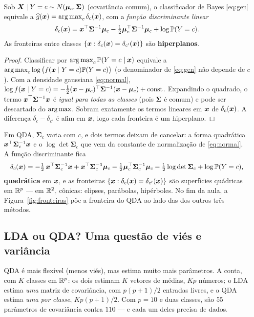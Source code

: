 \documentclass[11pt,a4paper]{article}
\begin{document}
\begin{proposicao}\label{prop:lda}
Sob $\bm{X}\mid Y=c\sim N(\bm{\mu}_c,\bm{\Sigma})$ (covariância comum), o classificador
de Bayes \eqref{eq:gen} equivale a $\ghat(\x)=\argmax_c \delta_c(\x)$, com a
\emph{função discriminante linear}
\[
  \delta_c(\bm{x}) = \bm{x}^\top\bm{\Sigma}^{-1}\bm{\mu}_c
   - \tfrac12\bm{\mu}_c^\top\bm{\Sigma}^{-1}\bm{\mu}_c + \log\mathbb{P}(Y=c).
\]
As fronteiras entre classes $\{\bm{x}:\delta_c(\bm{x})=\delta_{c'}(\bm{x})\}$ são
\textbf{hiperplanos}.
\end{proposicao}
\begin{proof}
Classificar por $\argmax_c \Prob(Y=c\mid\x)$ equivale a $\argmax_c \log\big(f(\x\mid
Y=c)\Prob(Y=c)\big)$ (o denominador de \eqref{eq:gen} não depende de $c$). Com a
densidade gaussiana \eqref{eq:normal},
$\log f(\bm{x}\mid Y=c)=-\tfrac12(\bm{x}-\bm{\mu}_c)^\top\bm{\Sigma}^{-1}(\bm{x}-\bm{\mu}_c)
+\text{const}$. Expandindo o quadrado, o termo $\bm{x}^\top\bm{\Sigma}^{-1}\bm{x}$ é
\emph{igual para todas as classes} (pois $\bm{\Sigma}$ é comum) e pode ser
descartado do $\argmax$. Sobram exatamente os termos lineares em $\bm{x}$ de
$\delta_c(\bm{x})$. A diferença $\delta_c-\delta_{c'}$ é afim em $\bm{x}$, logo cada
fronteira é um hiperplano.
\end{proof}

\begin{observacao}
Em QDA, $\bm{\Sigma}_c$ varia com $c$, e dois termos deixam de cancelar: a forma
quadrática $\bm{x}^\top\bm{\Sigma}_c^{-1}\bm{x}$ e o $\log\det\bm{\Sigma}_c$ que vem da
constante de normalização de \eqref{eq:normal}. A função discriminante fica
\[
  \delta_c(\bm{x}) = -\tfrac12\,\bm{x}^\top\bm{\Sigma}_c^{-1}\bm{x}
   + \bm{x}^\top\bm{\Sigma}_c^{-1}\bm{\mu}_c
   - \tfrac12\bm{\mu}_c^\top\bm{\Sigma}_c^{-1}\bm{\mu}_c
   - \tfrac12\log\det\bm{\Sigma}_c + \log\mathbb{P}(Y=c),
\]
\textbf{quadrática} em $\bm{x}$, e as fronteiras $\{\bm{x}:\delta_c(\bm{x})=\delta_{c'}(\bm{x})\}$
são superfícies quádricas em $\mathbb{R}^p$ --- em $\mathbb{R}^2$, cônicas: elipses, parábolas,
hipérboles. No fim da aula, a Figura~\ref{fig:fronteiras} põe a fronteira do QDA ao
lado das dos outros três métodos.
\end{observacao}

\subsection{LDA ou QDA? Uma questão de viés e variância}
QDA é mais flexível (menos viés), mas estima muito mais parâmetros. A conta, com $K$
classes em $\mathbb{R}^p$: os dois estimam $K$ vetores de médias, $Kp$ números; o LDA estima
\emph{uma} matriz de covariância, com $p(p+1)/2$ entradas livres, e o QDA estima
\emph{uma por classe}, $Kp(p+1)/2$. Com $p=10$ e duas classes, são $55$ parâmetros
de covariância contra $110$ --- e cada um deles precisa de dados.
\end{document}
